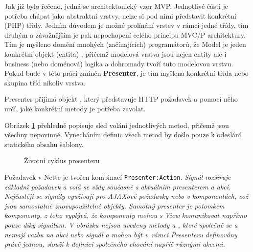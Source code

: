 Jak již bylo řečeno, jedná se architektonický vzor MVP. 
Jednotlivé části je potřeba chápat jako abstraktní vrstvy, nelze si pod nimi představit konkrétní (PHP) třidy.
Jedním důvodem je možné prolínání vrstev v rámci jedné třídy, tím druhým a závažnějším je pak nepochopení celého principu MVC/P architektury. Tím je myšleno domění mnohých (začínajících) programátorů, že Model je jeden konkrétní objekt (entita) , přičemž modelová vrstva jsou nejen entity ale i business (nebo doménová) logika a dohromady tvoří tuto modelovou vrstvu. Pokud bude v této práci zmíněn \textbf{Presenter}, je tím myšlena konkrétní třída nebo skupina tříd nikoliv vrstva.


Presenter přijímá objekt , který představuje HTTP požadavek a pomocí něho určí, jaké konkrétní metody je potřeba zavolat. 

Obrázek \ref{fig:zivotniCyklusPresenteru} přehledně popisuje sled volání jednotlivých metod, přičemž jsou všechny nepovinné. Vynecháním definic všech metod by došlo pouze k odeslání statického obsahu šablony.

\begin{figure}[h]
		\centering \tiny {}\selectfont
		\def\scgscale{1}
		
		\normalsize \sffamily
		\captionsetup{width=\linewidth}
		\caption{Životní cyklus presenteru}
		\label{fig:zivotniCyklusPresenteru}
\end{figure}

Požadavek v Nette je tvořen kombinací \texttt{Presenter:Action}. \it{Signál} rozšiřuje základní požadavek a volá se vždy současně s aktuálním presenterem a akcí. Nejčastěji se signály využívají pro AJAXové požadavky nebo v komponentách, což jsou samostatné znovupoužitelné objekty. Samotný presenter je potomkem komponenty, z toho vyplývá, že komponenty mohou s View komunikovat napřímo pouze díky signálům. V obrázku nejsou uvedeny metody  a , které společně se  a  nemají vazbu na \it{akci} nebo \it{signál} a mohou být v~rámci Presenteru definovány právě jednou, slouží k definici společného chování napříč různými akcemi\cite{NettePresentery}.

